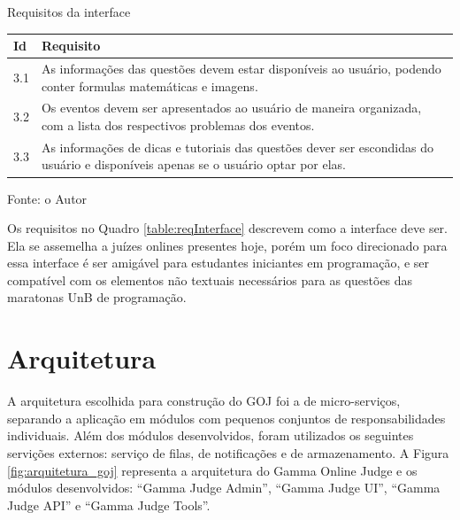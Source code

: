 \begin{quadro}
    \caption{Requisitos da interface}
    \centering
    \label{table:reqInterface}
    \begin{threeparttable}
    \begin{tabular}{ |p{0.6cm}|p{10cm}|  }
        \hline
        
        \textbf{Id} & 
        \textbf{Requisito} \\
        \hline
        
        3.1 & 
        As informações das questões devem estar disponíveis ao usuário, podendo conter formulas matemáticas e imagens. \\
        \hline
        
        3.2 & 
        Os eventos devem ser apresentados ao usuário de maneira organizada, com a lista dos respectivos problemas dos eventos.  \\ 
        \hline
        
        3.3 & 
        As informações de dicas e tutoriais das questões dever ser escondidas do usuário e disponíveis apenas se o usuário optar por elas.  \\
        \hline
    \end{tabular}
        \medskip
    \begin{tablenotes}
        \centering
        \item Fonte: o Autor
    \end{tablenotes}
    \end{threeparttable}

\end{quadro}

Os requisitos no Quadro \ref{table:reqInterface} descrevem como a interface deve ser. Ela se assemelha a juízes onlines presentes hoje, porém um foco direcionado para essa interface é ser amigável para estudantes iniciantes em programação, e ser compatível com os elementos não textuais necessários para as questões das maratonas UnB de programação.

\section{Arquitetura}
\label{sec:arquitetura}

A arquitetura escolhida para construção do GOJ foi a de micro-serviços, separando a aplicação em módulos com pequenos conjuntos de responsabilidades individuais. Além dos módulos desenvolvidos, foram utilizados os seguintes servições externos: serviço de filas, de notificações e de armazenamento. A Figura \ref{fig:arquitetura_goj} representa a arquitetura do Gamma Online Judge e os módulos desenvolvidos: ``Gamma Judge Admin'', ``Gamma Judge UI'', ``Gamma Judge API'' e ``Gamma Judge Tools''.

